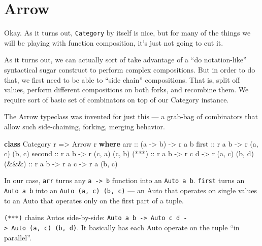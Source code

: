 \documentclass[]{article}
\newenvironment{Shaded}{}{}
\newcommand{\DataTypeTok}[1]{\textcolor[rgb]{0.56,0.13,0.00}{#1}}
\newcommand{\KeywordTok}[1]{\textcolor[rgb]{0.00,0.44,0.13}{\textbf{#1}}}
\newcommand{\NormalTok}[1]{#1}
\newcommand{\OtherTok}[1]{\textcolor[rgb]{0.00,0.44,0.13}{#1}}
\begin{document}
\section{Arrow}\label{arrow}

Okay. As it turns out, \texttt{Category} by itself is nice, but for many of the
things we will be playing with function composition, it's just not going to cut
it.

As it turns out, we can actually sort of take advantage of a ``do
notation-like'' syntactical sugar construct to perform complex compositions. But
in order to do that, we first need to be able to ``side chain'' compositions.
That is, split off values, perform different compositions on both forks, and
recombine them. We require sort of basic set of combinators on top of our
Category instance.

The Arrow typeclass was invented for just this --- a grab-bag of combinators
that allow such side-chaining, forking, merging behavior.

\begin{Shaded}
\begin{Highlighting}[]
\KeywordTok{class} \DataTypeTok{Category}\NormalTok{ r }\OtherTok{=\textgreater{}} \DataTypeTok{Arrow}\NormalTok{ r }\KeywordTok{where}
\OtherTok{    arr    ::}\NormalTok{ (a }\OtherTok{{-}\textgreater{}}\NormalTok{ b) }\OtherTok{{-}\textgreater{}}\NormalTok{ r a b}
\OtherTok{    first  ::}\NormalTok{ r a b }\OtherTok{{-}\textgreater{}}\NormalTok{ r (a, c) (b, c)}
\OtherTok{    second ::}\NormalTok{ r a b }\OtherTok{{-}\textgreater{}}\NormalTok{ r (c, a) (c, b)}
\OtherTok{    (***)  ::}\NormalTok{ r a b }\OtherTok{{-}\textgreater{}}\NormalTok{ r c d }\OtherTok{{-}\textgreater{}}\NormalTok{ r (a, c) (b, d)}
\OtherTok{    (\&\&\&)  ::}\NormalTok{ r a b }\OtherTok{{-}\textgreater{}}\NormalTok{ r a c }\OtherTok{{-}\textgreater{}}\NormalTok{ r a (b, c)}
\end{Highlighting}
\end{Shaded}

In our case, \texttt{arr} turns any \texttt{a\ -\textgreater{}\ b} function into
an \texttt{Auto\ a\ b}. \texttt{first} turns an \texttt{Auto\ a\ b} into an
\texttt{Auto\ (a,\ c)\ (b,\ c)} --- an Auto that operates on single values to an
Auto that operates only on the first part of a tuple.

\texttt{(***)} chains Autos side-by-side:
\texttt{Auto\ a\ b\ -\textgreater{}\ Auto\ c\ d\ -\textgreater{}\ Auto\ (a,\ c)\ (b,\ d)}.
It basically has each Auto operate on the tuple ``in parallel''.
\end{document}
